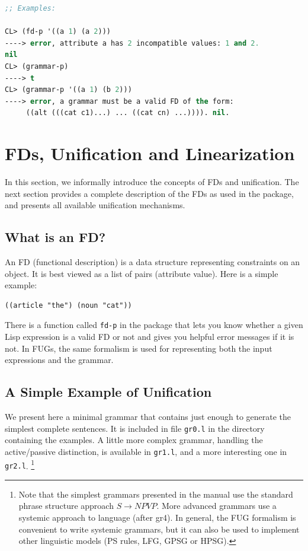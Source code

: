 \documentclass[10pt,a4paper]{report}
\begin{document}
\begin{lstlisting}[language=Lisp]
;; Examples:

CL> (fd-p '((a 1) (a 2))) 
----> error, attribute a has 2 incompatible values: 1 and 2.
nil
CL> (grammar-p)
----> t
CL> (grammar-p '((a 1) (b 2)))
----> error, a grammar must be a valid FD of the form:
	 ((alt (((cat c1)...) ... ((cat cn) ...)))). nil.
\end{lstlisting}   



\chapter{FDs, Unification and Linearization}

In this section, we informally introduce the concepts of FDs and
unification. The next section provides a complete description of
the FDs as used in the package, and presents all available
unification mechanisms.

\section{What is an FD?}

An FD (functional description) is a data structure representing constraints
on an object. It is best viewed as a list of pairs (attribute value).
Here is a simple example: 

\begin{lstlisting}
((article "the") (noun "cat"))
\end{lstlisting}

There is a function called {\tt fd-p} in the package that lets you know whether
a given Lisp expression is a valid FD or not and gives you helpful error
messages if it is not. 
In FUGs, the same formalism is used for representing both the
input expressions and the grammar. 


\section{A Simple Example of Unification}

We present here a minimal grammar that contains just enough to
generate the simplest complete sentences. It is included in file
{\tt gr0.l} in the directory containing the examples. A little more
complex grammar, handling the active/passive distinction, is
available in {\tt gr1.l}, and a more interesting one in {\tt gr2.l}.
\footnote{Note that the simplest grammars presented in the manual use the
standard phrase structure approach $S \rightarrow NP VP$.  More advanced grammars use
a systemic approach to language (after gr4).  In general, the FUG formalism
is convenient to write systemic grammars, but it can also be used to
implement other linguistic models (PS rules, LFG, GPSG or HPSG).}
\end{document}
